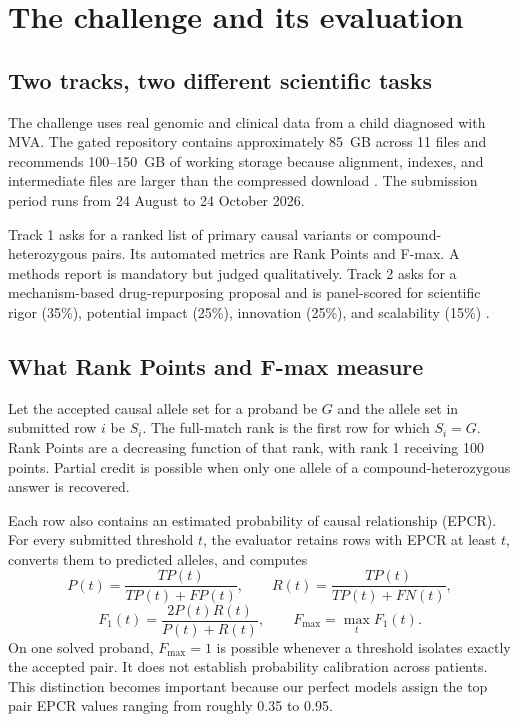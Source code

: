 \documentclass[11pt]{article}
\begin{document}
\section{The challenge and its evaluation}

\subsection{Two tracks, two different scientific tasks}

The challenge uses real genomic and clinical data from a child diagnosed with MVA. The gated repository contains approximately 85~GB across 11 files and recommends 100--150~GB of working storage because alignment, indexes, and intermediate files are larger than the compressed download \citep{hackathondata2026}. The submission period runs from 24 August to 24 October 2026.

Track 1 asks for a ranked list of primary causal variants or compound-heterozygous pairs. Its automated metrics are Rank Points and F-max. A methods report is mandatory but judged qualitatively. Track 2 asks for a mechanism-based drug-repurposing proposal and is panel-scored for scientific rigor (35\%), potential impact (25\%), innovation (25\%), and scalability (15\%) \citep{hackathon2026}.

\subsection{What Rank Points and F-max measure}

Let the accepted causal allele set for a proband be $G$ and the allele set in submitted row $i$ be $S_i$. The full-match rank is the first row for which $S_i=G$. Rank Points are a decreasing function of that rank, with rank 1 receiving 100 points. Partial credit is possible when only one allele of a compound-heterozygous answer is recovered.

Each row also contains an estimated probability of causal relationship (EPCR). For every submitted threshold $t$, the evaluator retains rows with EPCR at least $t$, converts them to predicted alleles, and computes
\begin{equation}
P(t)=\frac{TP(t)}{TP(t)+FP(t)},\qquad
R(t)=\frac{TP(t)}{TP(t)+FN(t)},
\end{equation}
\begin{equation}
F_1(t)=\frac{2P(t)R(t)}{P(t)+R(t)},\qquad
F_{\max}=\max_t F_1(t).
\end{equation}
On one solved proband, $F_{\max}=1$ is possible whenever a threshold isolates exactly the accepted pair. It does not establish probability calibration across patients. This distinction becomes important because our perfect models assign the top pair EPCR values ranging from roughly 0.35 to 0.95.
\end{document}
